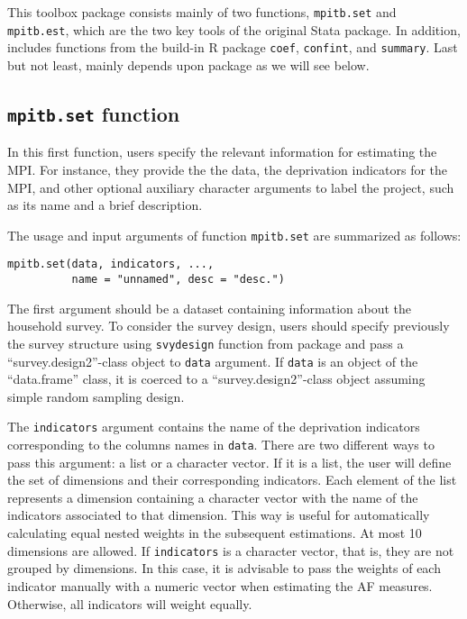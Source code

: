 This toolbox package consists mainly of two functions,
\texttt{mpitb.set} and \texttt{mpitb.est}, which are the two key tools of the original Stata package. In addition,  includes functions from the build-in R package  \texttt{coef}, \texttt{confint}, and \texttt{summary}. Last but not least,  mainly depends upon  package as we will see below.

\hypertarget{mpitb.set-function}{%
\subsection{\texorpdfstring{\texttt{mpitb.set} function}{mpitb.set function}}\label{mpitb.set-function}}

In this first function, users specify the relevant information for
estimating the MPI. For instance, they provide the the data, the deprivation indicators for the MPI, and other optional auxiliary character arguments to label the project, such as its name and a brief description.

The usage and input arguments of function \texttt{mpitb.set} are summarized as
follows:

\begin{verbatim}
mpitb.set(data, indicators, ..., 
          name = "unnamed", desc = "desc.")
\end{verbatim}

The first argument should be a dataset containing information about the
household survey. To consider the survey design, users should specify
previously the survey structure using \texttt{svydesign} function from
 package and pass a ``survey.design2''-class object to \texttt{data}
argument. If \texttt{data} is an object of the ``data.frame'' class, it is
coerced to a ``survey.design2''-class object assuming simple random
sampling design.

The \texttt{indicators} argument contains the name of the deprivation
indicators corresponding to the columns names in \texttt{data}. There are two
different ways to pass this argument: a list or a character vector. If
it is a list, the user will define the set of dimensions and their
corresponding indicators. Each element of the list represents a
dimension containing a character vector with the name of the indicators
associated to that dimension. This way is useful for automatically
calculating equal nested weights in the subsequent estimations. At most
10 dimensions are allowed. If \texttt{indicators} is a character vector, that
is, they are not grouped by dimensions. In this case, it is advisable to pass the
weights of each indicator manually with a numeric vector when estimating the AF measures. Otherwise, all indicators
will weight equally.

